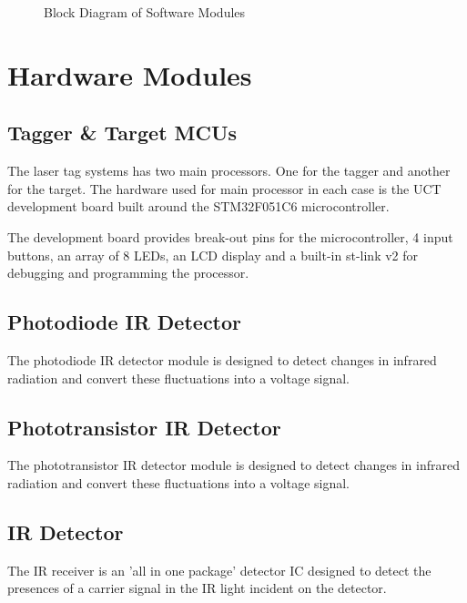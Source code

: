 \begin{figure}[H]
	\centering
	\caption{Block Diagram of Software Modules}
	\label{fig:system_overview_software}
\end{figure}



\section{Hardware Modules}

\subsection{Tagger \& Target MCUs}
The laser tag systems has two main processors. One for the tagger and another for the target. The hardware used for main processor in each case is the UCT development board built around the STM32F051C6 microcontroller.

The development board provides break-out pins for the microcontroller, 4 input buttons, an array of 8 LEDs, an LCD display and a built-in st-link v2 for debugging and programming the processor. 


\subsection{Photodiode IR Detector}

The photodiode IR detector module is designed to detect changes in infrared radiation and convert these fluctuations into a voltage signal.

\subsection{Phototransistor IR Detector}

The phototransistor IR detector module is designed to detect changes in infrared radiation and convert these fluctuations into a voltage signal.

\subsection{IR Detector}

The IR receiver is an 'all in one package' detector IC designed to detect the presences of a carrier signal in the IR light incident on the detector.

